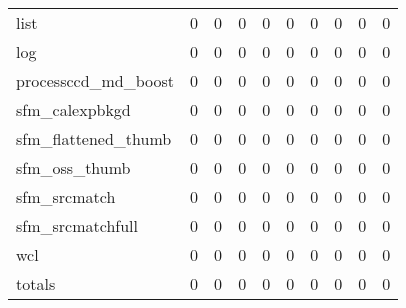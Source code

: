 \begin{table}
\begin{longtable}{lrrrrrrrrr}
		list                     & 0 & 0 & 0 & 0 & 0 & 0 & 0 & 0 & 0 \\
		log                      & 0 & 0 & 0 & 0 & 0 & 0 & 0 & 0 & 0 \\
		processccd\_md\_boost    & 0 & 0 & 0 & 0 & 0 & 0 & 0 & 0 & 0 \\
		sfm\_calexpbkgd          & 0 & 0 & 0 & 0 & 0 & 0 & 0 & 0 & 0 \\
		sfm\_flattened\_thumb    & 0 & 0 & 0 & 0 & 0 & 0 & 0 & 0 & 0 \\
		sfm\_oss\_thumb          & 0 & 0 & 0 & 0 & 0 & 0 & 0 & 0 & 0 \\
		sfm\_srcmatch            & 0 & 0 & 0 & 0 & 0 & 0 & 0 & 0 & 0 \\
		sfm\_srcmatchfull        & 0 & 0 & 0 & 0 & 0 & 0 & 0 & 0 & 0 \\
		wcl                      & 0 & 0 & 0 & 0 & 0 & 0 & 0 & 0 & 0 \\
		\hline
		totals                   & 0 & 0 & 0 & 0 & 0 & 0 & 0 & 0 & 0 \\
		\hline\hline
	\end{longtable}
\end{table}
